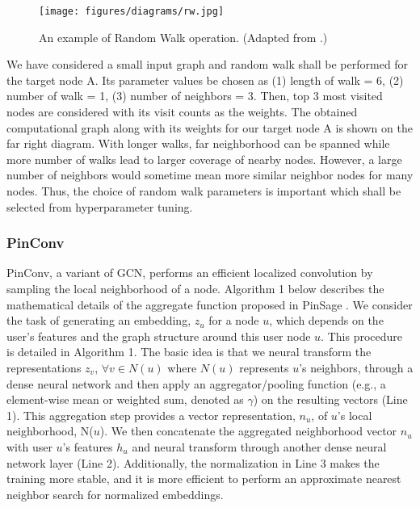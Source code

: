 \documentclass{kththesis}
\begin{document}
\newpage

\begin{figure}[h!]
\centering
\captionsetup{justification=centering}
\texttt{[image: figures/diagrams/rw.jpg]}
\caption{An example of Random Walk operation. (Adapted from \cite{PinSage}.)}
\label{fig:rw}
\end{figure}

We have considered a small input graph and random walk shall be performed for the target node A. Its parameter values be chosen as (1) length of walk = 6, (2) number of walk = 1, (3) number of neighbors = 3. Then, top 3 most visited nodes are considered with its visit counts as the weights. The obtained computational graph along with its weights for our target node A is shown on the far right diagram. With longer walks, far neighborhood can be spanned while more number of walks lead to larger coverage of nearby nodes. However, a large number of neighbors would sometime mean more similar neighbor nodes for many nodes. Thus, the choice of random walk parameters is important which shall be selected from hyperparameter tuning.

\subsubsection{PinConv}
\noindent PinConv, a variant of GCN, performs an efficient localized convolution by sampling the local neighborhood of a node. Algorithm 1 below describes the mathematical details of the aggregate function proposed in PinSage \cite{PinSage}. We consider the task of generating an embedding, $z_u$ for a node $u$, which depends on the user’s features and the graph structure around this user node $u$. This procedure is detailed in Algorithm 1. The basic idea is that we neural transform the representations $z_v$, $\forall v \in N(u)$ where $N(u)$ represents $u$’s neighbors, through a dense neural network and then apply an aggregator/pooling function (e.g., a element-wise mean or weighted sum, denoted as $\gamma$) on the resulting vectors (Line 1). This aggregation step provides a vector representation, $n_u$, of $u$’s local neighborhood, N($u$). We then concatenate the aggregated neighborhood vector $n_u$ with user $u$’s features $h_u$ and neural transform through another dense neural network layer (Line 2). Additionally, the normalization in Line 3 makes the training more stable, and it is more efficient to perform an approximate nearest neighbor search for normalized embeddings. \\
\end{document}
